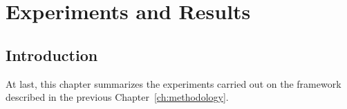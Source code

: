 \def\baselinestretch{1}

\chapter{Experiments and Results}\label{ch:experiments}

\def\baselinestretch{1.66}

\section{Introduction}\label{sec:experiments_introduction}

At last, this chapter summarizes the experiments carried out on the framework described in the previous Chapter~\ref{ch:methodology}.


